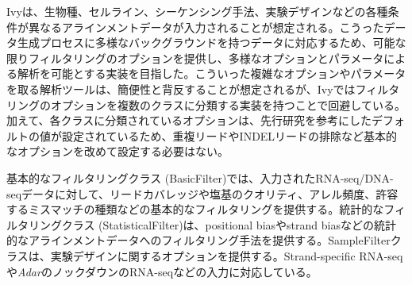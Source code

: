 \par
Ivyは、生物種、セルライン、シーケンシング手法、実験デザインなどの各種条件が異なるアラインメントデータが入力されることが想定される。こうったデータ生成プロセスに多様なバックグラウンドを持つデータに対応するため、可能な限りフィルタリングのオプションを提供し、多様なオプションとパラメータによる解析を可能とする実装を目指した。こういった複雑なオプションやパラメータを取る解析ツールは、簡便性と背反することが想定されるが、Ivyではフィルタリングのオプションを複数のクラスに分類する実装を持つことで回避している。加えて、各クラスに分類されているオプションは、先行研究を参考にしたデフォルトの値が設定されているため、重複リードやINDELリードの排除など基本的なオプションを改めて設定する必要はない。
\par
基本的なフィルタリングクラス (BasicFilter)では、入力されたRNA-seq/DNA-seqデータに対して、リードカバレッジや塩基のクオリティ、アレル頻度、許容するミスマッチの種類などの基本的なフィルタリングを提供する。統計的なフィルタリングクラス (StatisticalFilter)は、positional biasやstrand biasなどの統計的なアラインメントデータへのフィルタリング手法を提供する。SampleFilterクラスは、実験デザインに関するオプションを提供する。Strand-specific RNA-seqや\textit{Adar}のノックダウンのRNA-seqなどの入力に対応している。

